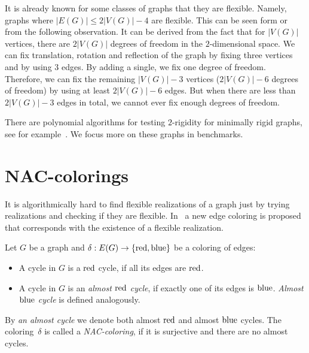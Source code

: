 It is already known for some classes of graphs that they are flexible.
Namely, graphs where \( |E(G)| \le 2|V(G)| - 4 \) are flexible.
This can be seen form 
or from the following observation.
It can be derived from the fact that for \( |V(G)| \) vertices,
there are \( 2|V(G)| \) degrees of freedom in the \( 2 \)-dimensional space.
We can fix translation, rotation and reflection of the graph
by fixing three vertices and by using \( 3 \) edges.
%
By adding a single, we fix one degree of freedom.
Therefore, we can fix the remaining \( |V(G)| - 3 \) vertices
(\( 2|V(G)| - 6 \) degrees of freedom)
by using at least \( 2|V(G)| - 6 \) edges.
But when there are less than \( 2|V(G)| - 3 \) edges in total,
we cannot ever fix enough degrees of freedom.


There are polynomial algorithms for testing \( 2 \)-rigidity
for minimally rigid graphs, see for example~\cite{polynomial-min-rigid}.
We focus more on these graphs in benchmarks.


\section{NAC-colorings}

It is algorithmically hard to find flexible realizations of a graph
just by trying realizations and checking if they are flexible.
In~\cite{legersky_original} a new edge coloring is proposed
that corresponds with the existence of a flexible realization.


\begin{definition}
	Let \( G \) be a graph and \( \delta: E(G) \to \{ \text{red}, \text{blue} \} \)
	be a coloring of edges:
	\begin{itemize}
		\item A cycle in \( G \) is a \( \text{red} \) cycle, if all its edges are \( \text{red} \).
		\item A cycle in \( G \) is an \emph{almost \( \text{red} \) cycle},
		      if exactly one of its edges is \( \text{blue} \).
		      \emph{Almost \( \text{blue} \) cycle} is defined analogously.
	\end{itemize}
	By \emph{an almost cycle} we denote both almost \( \text{red} \) and almost \( \text{blue} \) cycles.
	The coloring~\( \delta \) is called a \emph{NAC-coloring}, if it is surjective
	and there are no almost cycles.
\end{definition}
%

